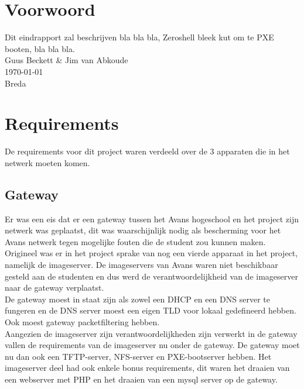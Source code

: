 \documentclass[12pt]{article}
\begin{document}
\clearpage
\section*{Voorwoord}
Dit eindrapport zal beschrijven bla bla bla, Zeroshell bleek kut om te PXE booten, bla bla bla.
\\
Guus Beckett \& Jim van Abkoude \\
\today \\
Breda
\newpage
\tableofcontents
\newpage
{}
\section{Requirements}
De requirements voor dit project waren verdeeld over de 3 apparaten die in het netwerk moeten komen.
\subsection{Gateway} %
\label{sub:gateway}
Er was een eis dat er een gateway tussen het Avans hogeschool en het project zijn netwerk was geplaatst, dit was waarschijnlijk nodig als bescherming voor het Avans netwerk tegen mogelijke fouten die de student zou kunnen maken. Origineel was er in het project sprake van nog een vierde apparaat in het project, namelijk de imageserver. De imageservers van Avans waren niet beschikbaar gesteld aan de studenten en dus werd de verantwoordelijkheid van de imageserver naar de gateway verplaatst.
\\De gateway moest in staat zijn als zowel een DHCP en een DNS server te fungeren en de DNS server moest een eigen TLD voor lokaal gedefineerd hebben. Ook moest gateway packetfiltering hebben.
\\Aangezien de imageserver zijn verantwoordelijkheden zijn verwerkt in de gateway vallen de requirements van de imageserver nu onder de gateway. De gateway moet nu dan ook een TFTP-server, NFS-server en PXE-bootserver hebben. Het imageserver deel had ook enkele bonus requirements, dit waren het draaien van een webserver met PHP en het draaien van een mysql server op de gateway.
\end{document}
